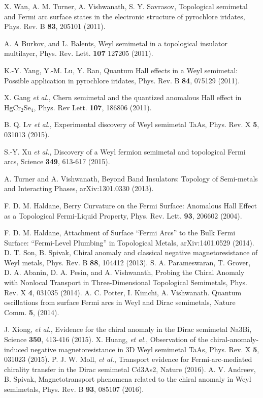 \documentclass[aps,twocolumn,prl,groupedaddress]{revtex4}
\begin{document}
\begin{thebibliography}{99}
 X. Wan, A. M. Turner, A. Vishwanath, S. Y. Savrasov, Topological semimetal and Fermi arc surface states in the electronic structure of pyrochlore iridates, Phys. Rev. B {\bf 83}, 205101 (2011).

 A. A Burkov, and L. Balents, Weyl semimetal in a topological insulator multilayer, Phys. Rev. Lett. {\bf 107} 127205 (2011).

 K.-Y. Yang, Y.-M. Lu, Y. Ran, Quantum Hall effects in a Weyl semimetal: Possible application in pyrochlore iridates, Phys. Rev. B {\bf 84}, 075129  (2011). 

 X. Gang {\it et al.}, Chern semimetal and the quantized anomalous Hall effect in HgCr$_2$Se$_4$, Phys. Rev Lett. {\bf 107}, 186806 (2011).

 B. Q. Lv {\it et al.}, Experimental discovery of Weyl semimetal TaAs, Phys. Rev. X {\bf 5}, 031013 (2015).

 S.-Y. Xu {\it et al.}, Discovery of a Weyl fermion semimetal and topological Fermi arcs, Science {\bf 349}, 613-617 (2015).

A. Turner and A. Vishwanath, Beyond Band Insulators: Topology of Semi-metals and Interacting Phases, arXiv:1301.0330 (2013).

F. D. M. Haldane, Berry Curvature on the Fermi Surface: Anomalous Hall Effect as a Topological Fermi-Liquid Property, Phys. Rev. Lett. {\bf 93}, 206602 (2004).

F. D. M. Haldane, Attachment of Surface ``Fermi Arcs'' to the Bulk Fermi Surface: ``Fermi-Level Plumbing'' in Topological Metals, arXiv:1401.0529 (2014).
 D. T. Son, B. Spivak, Chiral anomaly and classical negative magnetoresistance of Weyl metals, Phys. Rev. B {\bf 88}, 104412 (2013).
 S. A. Parameswaran, T. Grover, D. A. Abanin, D. A. Pesin, and A. Vishwanath, Probing the Chiral Anomaly with Nonlocal Transport in Three-Dimensional Topological Semimetals, Phys. Rev. X {\bf 4}, 031035 (2014).
 A. C. Potter, I. Kimchi, A. Vishwanath. Quantum oscillations from surface Fermi arcs in Weyl and Dirac semimetals, Nature Comm. {\bf 5}, (2014).

 J. Xiong, {\it et al.}, Evidence for the chiral anomaly in the Dirac semimetal Na3Bi, Science {\bf 350}, 413-416 (2015).
 X. Huang, {\it et al.}, Observation of the chiral-anomaly-induced negative magnetoresistance in 3D Weyl semimetal TaAs, Phys. Rev. X {\bf 5}, 031023 (2015).
 P. J. W. Moll, {\it et al.}, Transport evidence for Fermi-arc-mediated chirality transfer in the Dirac semimetal Cd3As2, Nature (2016).
 A. V. Andreev, B. Spivak, Magnetotransport phenomena related to the chiral anomaly in Weyl semimetals, Phys. Rev. B {\bf 93}, 085107 (2016).


\end{thebibliography}
\end{document}
